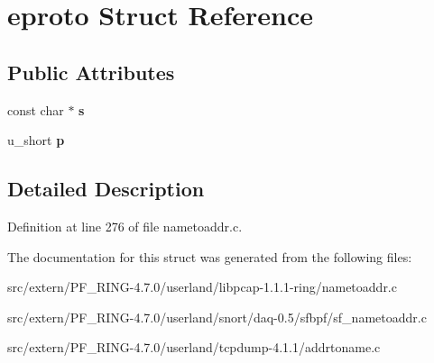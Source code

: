 \hypertarget{structeproto}{
\section{eproto Struct Reference}
\label{structeproto}
}
\subsection*{Public Attributes}
\begin{DoxyCompactItemize}
\item 
\hypertarget{structeproto_a84b582abadbe1a2545739be0b4a8bc1e}{
const char $\ast$ {\bfseries s}}
\label{structeproto_a84b582abadbe1a2545739be0b4a8bc1e}

\item 
\hypertarget{structeproto_a4eb7cedaae4e161381c0d5e35a0e33ca}{
u\_\-short {\bfseries p}}
\label{structeproto_a4eb7cedaae4e161381c0d5e35a0e33ca}

\end{DoxyCompactItemize}


\subsection{Detailed Description}


Definition at line 276 of file nametoaddr.c.



The documentation for this struct was generated from the following files:\begin{DoxyCompactItemize}
\item 
src/extern/PF\_\-RING-\/4.7.0/userland/libpcap-\/1.1.1-\/ring/nametoaddr.c\item 
src/extern/PF\_\-RING-\/4.7.0/userland/snort/daq-\/0.5/sfbpf/sf\_\-nametoaddr.c\item 
src/extern/PF\_\-RING-\/4.7.0/userland/tcpdump-\/4.1.1/addrtoname.c\end{DoxyCompactItemize}
